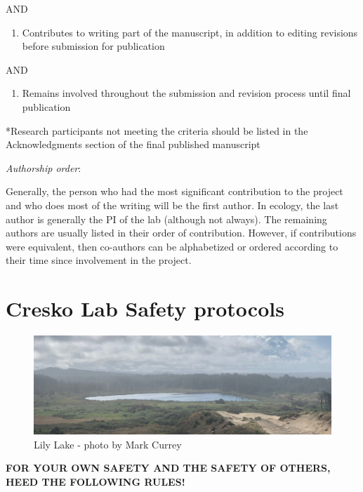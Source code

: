 \documentclass[
]{book}
\providecommand{\tightlist}{%
  \setlength{\itemsep}{0pt}\setlength{\parskip}{0pt}}
\begin{document}
AND

\begin{enumerate}
\def\labelenumi{\arabic{enumi})}
\setcounter{enumi}{2}
\tightlist
\item
  Contributes to writing part of the manuscript, in addition to editing revisions before
  submission for publication
\end{enumerate}

AND

\begin{enumerate}
\def\labelenumi{\arabic{enumi})}
\setcounter{enumi}{3}
\tightlist
\item
  Remains involved throughout the submission and revision process until final publication
\end{enumerate}

*Research participants not meeting the criteria should be listed in the Acknowledgments
section of the final published manuscript

\emph{Authorship order}:

Generally, the person who had the most significant contribution to the project and who does
most of the writing will be the first author. In ecology, the last author is generally the PI of the
lab (although not always). The remaining authors are usually listed in their order of
contribution. However, if contributions were equivalent, then co-authors can be alphabetized
or ordered according to their time since involvement in the project.

\hypertarget{cresko-lab-safety-protocols}{%
\chapter{Cresko Lab Safety protocols}\label{cresko-lab-safety-protocols}}

\begin{figure}
\centering
\includegraphics{images/lily_lake_header.jpg}
\caption{Lily Lake - photo by Mark Currey}
\end{figure}

\textbf{FOR YOUR OWN SAFETY AND THE SAFETY OF OTHERS, HEED THE FOLLOWING RULES!}
\end{document}
